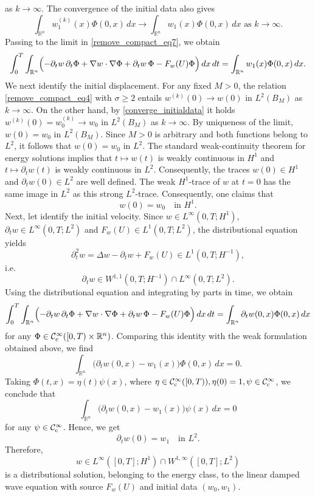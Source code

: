 \documentclass[11pt,reqno]{amsart}
\newcommand{\ity}{\infty}
\begin{document}
	as $k\to \ity$. The convergence of the initial data also gives
	\[
	\int_{\mathbb R^n}w_1^{(k)}(x)\Phi(0,x)\,dx\to \int_{\mathbb R^n}w_1(x)\Phi(0,x)\,dx\text{ as }k\to \ity.
	\]
	Passing to the limit in \eqref{remove_compact_eq7}, we obtain
	\[
	\begin{aligned}
		\int_0^T\int_{\mathbb R^n}\Bigl(-\partial_tw\,\partial_t\Phi+\nabla w\cdot\nabla\Phi+\partial_tw\,\Phi-F_w(U)\Phi\Bigr)\,dx\,dt=\int_{\mathbb R^n}w_1(x)\Phi(0,x)\,dx.
	\end{aligned}
	\]
	We next identify the initial displacement. For any fixed $M>0$, the relation \eqref{remove_compact_eq4} with $\sigma\geq2$ entails $w^{(k)}(0)\to  w(0)$ in $L^2(B_M)$ as $k\to \ity$. On the other hand, by \eqref{converge_initialdata} it holds $w^{(k)}(0)=w_0^{(k)}\to  w_0$ in $L^2(B_M)$ as $k\to \ity$. By uniqueness of the limit, $w(0)=w_0$ in $L^2(B_M)$. Since $M>0$ is arbitrary and both functions belong to
	$L^2$, it follows that $w(0)=w_0$ in $L^2$. The standard weak-continuity theorem for energy solutions implies that $t\mapsto w(t)$ is weakly continuous in $H^1$ and $t\mapsto \partial_tw(t)$ is weakly continuous in $L^2$. Consequently, the traces $w(0)\in H^1$ and $\partial_tw(0)\in L^2$ are well defined. The weak $H^1$-trace of $w$ at $t=0$ has the same image in $L^2$ as this strong $L^2$-trace. Consequently, one claims that
	$$w(0)=w_0 \quad\text{in } H^1. $$
	Next, let identify the initial velocity. Since $w\in L^\infty(0,T;H^1)$, $\partial_tw\in L^\infty(0,T;L^2)$ and $F_w(U)\in L^1(0,T;L^2)$, the distributional equation yields
	\[
	\partial_t^2w=\Delta w-\partial_tw+F_w(U)\in L^1(0,T;H^{-1}),
	\]
	i.e.
	\[
	\partial_tw\in
	W^{1,1}(0,T;H^{-1})
	\cap L^\infty(0,T;L^2).
	\]
	Using the distributional equation and integrating by parts in time, we obtain
	\[
	\begin{aligned}
		\int_0^T\int_{\mathbb R^n}\Bigl(-\partial_tw\,\partial_t\Phi+\nabla w\cdot\nabla\Phi+\partial_tw\,\Phi-F_w(U)\Phi\Bigr)\,dx\,dt=\int_{\mathbb R^n}\partial_tw(0,x)\Phi(0,x)\,dx
	\end{aligned}
	\]
	for any $\Phi\in \mathcal{C}^\infty_{\rm c}([0,T)\times\mathbb R^n)$. Comparing this identity with the weak formulation obtained above, we find
	\[
	\int_{\mathbb R^n}\bigl(\partial_tw(0,x)-w_1(x)\bigr)\Phi(0,x)\,dx=0.
	\]
	Taking $\Phi(t,x)=\eta(t)\psi(x)$, where $\eta\in \mathcal{C}^\infty_{\rm c}([0,T)),\eta(0)=1,\psi\in \mathcal{C}^\infty_{\rm c}$, we conclude that
	\[
	\int_{\mathbb R^n}\bigl(\partial_tw(0,x)-w_1(x)\bigr)\psi(x)\,dx=0
	\]
	for any $\psi\in \mathcal{C}^\infty_{\rm c}$. Hence, we get
	\[
	\partial_tw(0)=w_1
	\quad\text{in }L^2.
	\]
	Therefore,
	\[
	w\in L^\infty([0,T];H^1)\cap W^{1,\infty}([0,T];L^2)
	\]
	is a distributional solution, belonging to the energy class, to the linear damped wave equation with source $F_w(U)$ and initial data $(w_0,w_1)$. \medskip
	
\end{document}
